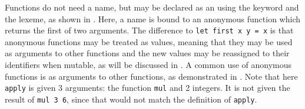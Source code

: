 \documentclass[fsharpnotes.tex]{subfiles}
\begin{document}
Functions do not need a name, but may be declared as an  using the  keyword and the \idx[->@\lstinline{->}]{\lexeme{->}} lexeme, as shown in .
%
%
Here, a name is bound to an anonymous function which returns the first of two arguments. The difference to \lstinline!let first x y = x! is that anonymous functions may be treated as values, meaning that they may be used as arguments to other functions and the new values may be reassigned to their identifiers when mutable, as will be discussed in . A common use of anonymous functions is as arguments to other functions, as demonstrated in .
%
%
Note that here \lstinline!apply! is given 3 arguments: the function \lstinline!mul! and 2 integers. It is not given the result of \lstinline!mul 3 6!, since that would not match the definition of \lstinline!apply!. 
\end{document}
